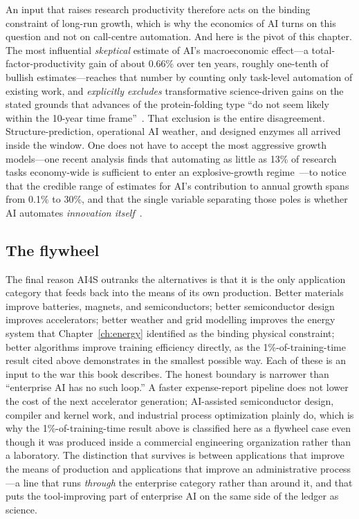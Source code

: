 An input that raises research productivity therefore acts on the binding constraint of long-run growth, which is why the economics of AI turns on this question and not on call-centre automation. And here is the pivot of this chapter. The most influential \emph{skeptical} estimate of AI's macroeconomic effect---a total-factor-productivity gain of about 0.66\% over ten years, roughly one-tenth of bullish estimates---reaches that number by counting only task-level automation of existing work, and \emph{explicitly excludes} transformative science-driven gains on the stated grounds that advances of the protein-folding type ``do not seem likely within the 10-year time frame''~\cite{acemoglu}. That exclusion is the entire disagreement. Structure-prediction, operational AI weather, and designed enzymes all arrived inside the window. One does not have to accept the most aggressive growth models---one recent analysis finds that automating as little as 13\% of research tasks economy-wide is sufficient to enter an explosive-growth regime~\cite{davidson}---to notice that the credible range of estimates for AI's contribution to annual growth spans from 0.1\% to 30\%, and that the single variable separating those poles is whether AI automates \emph{innovation itself}~\cite{quadrillion}.

\subsection{The flywheel}
\label{sec:flywheel}

The final reason AI4S outranks the alternatives is that it is the only application category that feeds back into the means of its own production. Better materials improve batteries, magnets, and semiconductors; better semiconductor design improves accelerators; better weather and grid modelling improves the energy system that Chapter~\ref{ch:energy} identified as the binding physical constraint; better algorithms improve training efficiency directly, as the 1\%-of-training-time result cited above demonstrates in the smallest possible way. Each of these is an input to the war this book describes. The honest boundary is narrower than ``enterprise AI has no such loop.'' A faster expense-report pipeline does not lower the cost of the next accelerator generation; AI-assisted semiconductor design, compiler and kernel work, and industrial process optimization plainly do, which is why the 1\%-of-training-time result above is classified here as a flywheel case even though it was produced inside a commercial engineering organization rather than a laboratory. The distinction that survives is between applications that improve the means of production and applications that improve an administrative process---a line that runs \emph{through} the enterprise category rather than around it, and that puts the tool-improving part of enterprise AI on the same side of the ledger as science.

